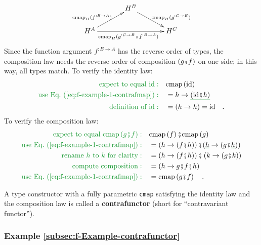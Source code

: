 \[
\xymatrix{\xyScaleY{1.5pc}\xyScaleX{3pc} & H^{B}\ar[rd]\sp(0.6){\ ~\text{cmap}_{H}(g^{:C\rightarrow B})}\\
H^{A}\ar[ru]\sp(0.4){\text{cmap}_{H}(f^{:B\rightarrow A})\ }\ar[rr]\sb(0.5){\text{cmap}_{H}(g^{:C\rightarrow B}\bef f^{:B\rightarrow A})\ ~} &  & H^{C}
}
\]
Since the function argument $f^{:B\rightarrow A}$ has the reverse
order of types, the composition law needs the reverse order of composition
$\left(g\bef f\right)$ on one side; in this way, all types match.
To verify the identity law:
\begin{align*}
{\color{greenunder}\text{expect to equal }\text{id}:}\quad & \text{cmap}\left(\text{id}\right)\\
{\color{greenunder}\text{use Eq.~(\ref{eq:f-example-1-contrafmap})}:}\quad & =h\rightarrow\gunderline{(\text{id}\bef h)}\\
{\color{greenunder}\text{definition of }\text{id}:}\quad & =\left(h\rightarrow h\right)=\text{id}\quad.
\end{align*}
To verify the composition law:
\begin{align*}
{\color{greenunder}\text{expect to equal }\text{cmap}\left(g\bef f\right):}\quad & \text{cmap}\left(f\right)\bef\text{cmap}\left(g\right)\\
{\color{greenunder}\text{use Eq.~(\ref{eq:f-example-1-contrafmap})}:}\quad & =\left(h\rightarrow(f\bef h)\right)\bef(\gunderline h\rightarrow(g\bef\gunderline h))\\
{\color{greenunder}\text{rename }h\text{ to }k\text{ for clarity}:}\quad & =\left(h\rightarrow(f\bef h)\right)\bef\left(k\rightarrow(g\bef k)\right)\\
{\color{greenunder}\text{compute composition}:}\quad & =\left(h\rightarrow g\bef f\bef h\right)\\
{\color{greenunder}\text{use Eq.~(\ref{eq:f-example-1-contrafmap})}:}\quad & =\text{cmap}\left(g\bef f\right)\quad.
\end{align*}

A type constructor with a fully parametric \lstinline!cmap! satisfying
the identity law and the composition law is called a \textbf{contrafunctor}
(short for \textsf{``}contravariant functor\textsf{''}). 

\subsubsection{Example \label{subsec:f-Example-contrafunctor}\ref{subsec:f-Example-contrafunctor}}

